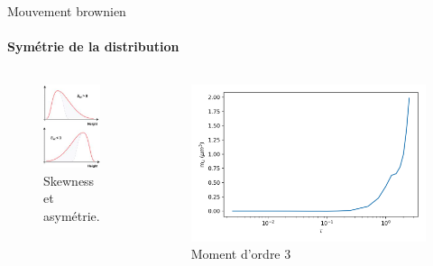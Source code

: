 \documentclass[11pt]{beamer}
\begin{document}
\begin{frame}{Mouvement brownien}
\framesubtitle{Symétrie de la distribution}
\begin{columns}
    \begin{figure}
    \centering
    \includegraphics[width=0.75\linewidth]{exemples_skewness_2.png}
    \caption{Skewness et asymétrie.}
    \label{fig:skewness}
    \end{figure}
    
	
	\begin{figure}
    	\centering
    	\includegraphics[width=0.9\linewidth]{m_3.png}
    	\caption{Moment d'ordre 3}
    	\label{fig:moment3}
	\end{figure}
\end{columns}
\end{frame}
\end{document}

